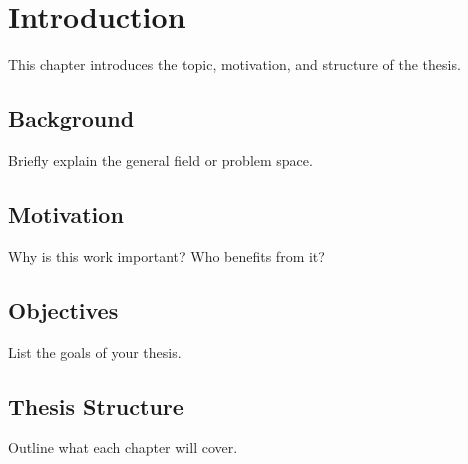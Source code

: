 \chapter{Introduction}

This chapter introduces the topic, motivation, and structure of the thesis.

\section{Background}
Briefly explain the general field or problem space.

\section{Motivation}
Why is this work important? Who benefits from it?

\section{Objectives}
List the goals of your thesis.

\section{Thesis Structure}
Outline what each chapter will cover.